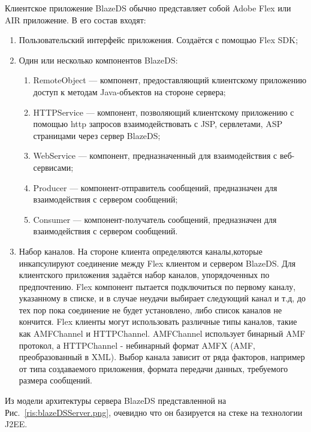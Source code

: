 Клиентское приложение BlazeDS обычно представляет собой Adobe Flex или AIR приложение. В его состав входят: 

\begin{enumerate}
\item Пользовательский интерфейс приложения. Создаётся с помощью Flex SDK;
\item Один или несколько компонентов BlazeDS: 
\begin{enumerate}
\item RemoteObject --- компонент, предоставляющий клиентскому приложению доступ к методам Java-объектов на стороне сервера; 
\item HTTPService --- компонент, позволяющий клиентскому приложению с помощью http запросов взаимодействовать с JSP, сервлетами, 
ASP страницами через сервер BlazeDS;
\item WebService --- компонент, предназначенный для взаимодействия с веб-сервисами;
\item Producer --- компонент-отправитель сообщений, предназначен для взаимодействия с сервером сообщений;
\item Consumer --- компонент-получатель сообщений, предназначен для взаимодействия с сервером сообщений.
\end{enumerate}
\item Набор каналов. На стороне клиента определяются каналы,которые инкапсулируют соединение между Flex клиентом и сервером 
BlazeDS. Для клиентского приложения задаётся набор каналов, упорядоченных по предпочтению. Flex компонент пытается подключиться 
по первому каналу, указанному в списке, и в случае неудачи выбирает следующий канал и т.д, до тех пор пока соединение не будет 
установлено, либо список каналов не кончится. Flex клиенты могут использовать различные типы каналов, такие как AMFChannel и
HTTPChannel. AMFChannel использует бинарный AMF протокол, а HTTPChannel - небинарный формат AMFX (AMF, преобразованный в XML). 
Выбор канала зависит от ряда факторов, например от типа создаваемого приложения, формата передачи данных, требуемого размера 
сообщений.
\end{enumerate}

Из модели архитектуры сервера BlazeDS представленной на Рис.~\ref{ris:blazeDSServer.png}, очевидно что он базируется
на стеке на технологии J2EE.

